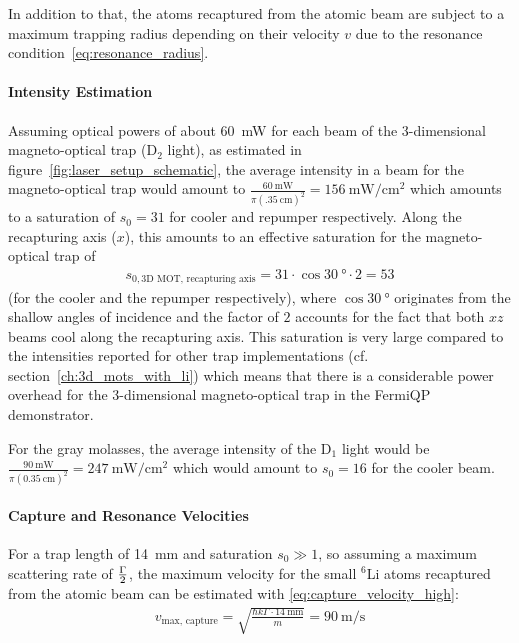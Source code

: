 In addition to that, the atoms recaptured from the atomic beam are subject to a maximum trapping radius depending on their velocity $v$ due to the resonance condition~\eqref{eq:resonance_radius}.

\paragraph{Intensity Estimation}
Assuming optical powers of about \SI{60}{\milli\watt} for each beam of the 3-dimensional magneto-optical trap (D$_2$ light), as estimated in figure~\ref{fig:laser_setup_schematic}, the average intensity in a beam for the magneto-optical trap would amount to $\frac{\SI{60}{\milli\watt}}{\pi (\SI{.35}{\centi\meter})^2} = \SI{156}{\milli\watt\per\centi\meter\squared}$ which amounts to a saturation of $s_0 = 31$ for cooler and repumper respectively. Along the recapturing axis ($x$), this amounts to an effective saturation for the magneto-optical trap of
\begin{align}
    s_{0, \text{3D MOT, recapturing axis}} = 31 \cdot \cos \SI{30}{\degree} \cdot 2 = 53
\end{align}
(for the cooler and the repumper respectively), where $\cos \SI{30}{\degree}$ originates from the shallow angles of incidence and the factor of $2$ accounts for the fact that both $xz$ beams cool along the recapturing axis. This saturation is very large compared to the intensities reported for other trap implementations (cf. section~\ref{ch:3d_mots_with_li}) which means that there is a considerable power overhead for the 3-dimensional magneto-optical trap in the FermiQP demonstrator.

For the gray molasses, the average intensity of the D$_1$ light would be $\frac{\SI{90}{\milli\watt}}{\pi (\SI{0.35}{\centi\meter})^2} = \SI{247}{\milli\watt\per\centi\meter\squared}$ which would amount to $s_0 = 16$ for the cooler beam.

\paragraph{Capture and Resonance Velocities}
For a trap length of \SI[]{14}{\milli\meter} and saturation $s_0 \gg 1$, so assuming a maximum scattering rate of $\Gamma \over 2$, the maximum velocity for the small $^6$Li atoms recaptured from the atomic beam can be estimated with \eqref{eq:capture_velocity_high}:
\begin{align}
    v_\text{max, capture} = \sqrt{\frac{\hbar k \Gamma \cdot \SI[]{14}{\milli\meter}}{m}} = \SI[]{90}{\meter\per\second}
\end{align}


